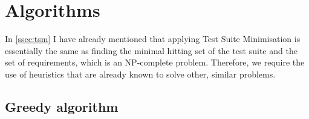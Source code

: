 
\section{Algorithms}
In \autoref{ssec:tsm} I have already mentioned that applying Test Suite Minimisation is essentially the same as finding the minimal hitting set of the test suite and the set of requirements, which is an NP-complete problem. Therefore, we require the use of heuristics that are already known to solve other, similar problems.

\subsection{Greedy algorithm}
